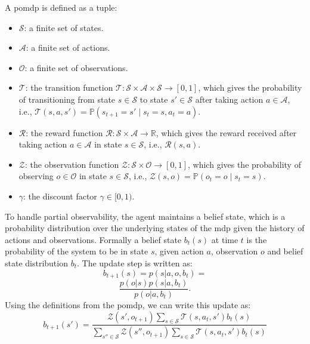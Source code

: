 A \ac{pomdp} is defined as a tuple:

\begin{itemize}
\item $\mathcal{S}$: a finite set of states.
\item $\mathcal{A}$: a finite set of actions.
\item $\mathcal{O}$: a finite set of observations.
\item $\mathcal{T}$: the transition function $\mathcal{T}: \mathcal{S} \times \mathcal{A} \times \mathcal{S} \rightarrow [0, 1]$, which gives the probability of transitioning from state $s \in \mathcal{S}$ to state $s' \in \mathcal{S}$ after taking action $a \in \mathcal{A}$, i.e., $\mathcal{T}(s, a, s') = \mathbb{P}(s_{t+1} = s' \mid s_t = s, a_t = a)$.
\item $\mathcal{R}$: the reward function $\mathcal{R}: \mathcal{S} \times \mathcal{A} \rightarrow \mathbb{R}$, which gives the reward received after taking action $a \in \mathcal{A}$ in state $s \in \mathcal{S}$, i.e., $\mathcal{R}(s, a)$.
\item $\mathcal{Z}$: the observation function $\mathcal{Z}: \mathcal{S} \times \mathcal{O} \rightarrow [0, 1]$, which gives the probability of observing $o \in \mathcal{O}$ in state $s \in \mathcal{S}$, i.e., $\mathcal{Z}(s, o) = \mathbb{P}(o_{t} = o \mid s_t = s)$.
\item $\gamma$: the discount factor $\gamma \in [0, 1)$.
\end{itemize}

To handle partial observability, the agent maintains a belief state, which is a probability distribution over the underlying states of the \ac{mdp} given the history of 
actions and observations. Formally a belief state $b_t(s)$ at time $t$ is the probability of the system to be in state $s$, 
given action $a$, observation $o$ and belief state distribution $b_{t}$. The update step is written as:
\begin{equation*}
    b_{t+1}(s) = p(s|a,o,b_{t}) = 
\end{equation*}
\begin{equation*}
    \frac{p(o|s) p(s|a,b_{t})}{p(o|a,b_{t})}.
\end{equation*}
Using the definitions from the \ac{pomdp}, we can write this update as:
\begin{equation}
    \label{pomdp_bayes}
b_{t+1}(s') = \frac{\mathcal{Z}(s', o_{t+1}) \sum_{s \in \mathcal{S}} \mathcal{T}(s, a_t, s') b_t(s)}{\sum_{s'' \in \mathcal{S}} \mathcal{Z}(s'', o_{t+1}) \sum_{s \in \mathcal{S}} \mathcal{T}(s, a_t, s') b_t(s)}
\end{equation}

